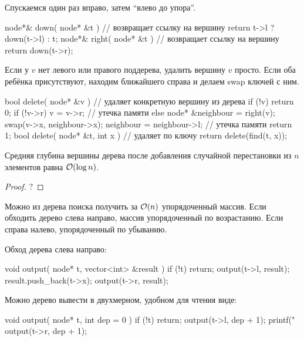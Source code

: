 
  Спускаемся один раз вправо, затем ``влево до упора''.
\begin{code}
  node*& down( node* &t ) { // возвращает ссылку на вершину
    return t->l ? down(t->l) : t;
  }
  node*& right( node* &t ) { // возвращает ссылку на вершину
    return down(t->r);
  }
\end{code}


  Если у $v$ нет левого или правого поддерева, удалить вершину $v$ просто.
  Если оба ребёнка присутствуют, находим ближайшего справа и делаем swap ключей с ним.
\begin{code}
  bool delete( node* &v ) { // удаляет конкретную вершину из дерева
    if (!v) return 0;
    if (!v->r) {
      v = v->r; // утечка памяти
    } else {
      node* &neighbour = right(v);
      swap(v->x, neighbour->x);
      neighbour = neighbour->l; // утечка памяти
    }
    return 1;
  }
  bool delete( node* &t, int x ) { // удаляет по ключу
    return delete(find(t, x));
  }
     
\end{code}

\begin{Thm}{Средняя глубина вершины дерева после добавления случайной перестановки из $n$ элементов равна $\mathcal{O}(\log n)$}.
\label{Thm:DepthOfRandomTree}
\begin{proof}
  ?
\end{proof}
\end{Thm}


Можно из дерева поиска получить за $\mathcal{O}(n)$ упорядоченный массив. Если обходить дерево
слева направо, массив упорядоченный по возрастанию. Если справа налево, упорядоченный по убыванию.

Обход дерева слева направо:
  
\begin{code}
  void output( node* t, vector<int> &result ) { 
    if (!t)
      return;
    output(t->l, result);
    result.push_back(t->x);
    output(t->r, result);
  }
\end{code}

Можно дерево вывести в двухмерном, удобном для чтения виде:

\begin{code}
  void output( node* t, int dep = 0 ) { 
    if (!t)
      return;
    output(t->l, dep + 1);
    printf("%
    output(t->r, dep + 1);
  }
\end{code}

